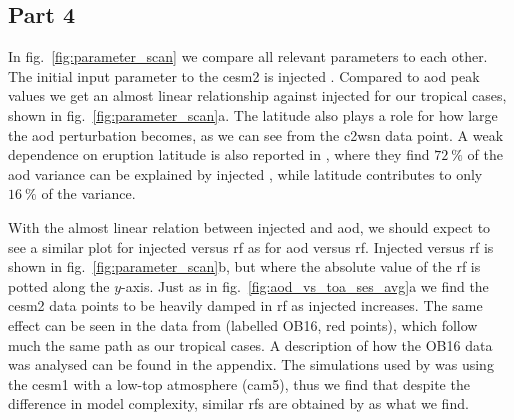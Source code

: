 \documentclass{ametsocV6.1}
\newcommand{\iso}[1][i]{{#1}njected \ce{SO2}}
\begin{document}
\subsection{Part 4}

In fig.~\ref{fig:parameter_scan} we compare all relevant parameters to each other. The
initial input parameter to the \gls{cesm2} is injected . Compared to \gls{aod}
peak values we get an almost linear relationship against \iso{} for our tropical cases,
shown in fig.~\ref{fig:parameter_scan}a. The latitude also plays a role for how large
the \gls{aod} perturbation becomes, as we can see from the \gls{c2wsn} data point. A
weak dependence on eruption latitude is also reported in \citet{marshall2019}, where
they find \(\SI{72}{\percent}\) of the \gls{aod} variance can be explained by \iso{},
while latitude contributes to only \(\SI{16}{\percent}\) of the variance.

With the almost linear relation between injected  and \gls{aod}, we should
expect to see a similar plot for \iso{} versus \gls{rf} as for \gls{aod} versus
\gls{rf}. \iso[I] versus \gls{rf} is shown in fig.~\ref{fig:parameter_scan}b, but where
the absolute value of the \gls{rf} is potted along the \(y\)-axis. Just as in
fig.~\ref{fig:aod_vs_toa_ses_avg}a we find the \gls{cesm2} data points to be heavily
damped in \gls{rf} as \iso{} increases. The same effect can be seen in the data from
\citet{ottobliesner2016} (labelled OB16, red points), which follow much the same path as
our tropical cases. A description of how the OB16 data was analysed can be found in the
appendix. The simulations used by \citet{ottobliesner2016} was using the \gls{cesm1}
with a low-top atmosphere (\gls{cam5}), thus we find that despite the difference in
model complexity, similar \glspl{rf} are obtained by \citet{ottobliesner2016} as what we
find.
\end{document}
